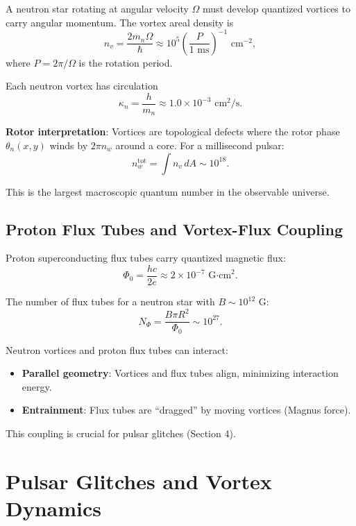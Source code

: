 \documentclass[12pt,a4paper]{article}
\theoremstyle{definition}
\theoremstyle{remark}
\begin{document}
A neutron star rotating at angular velocity $\Omega$ must develop quantized vortices to carry angular momentum. The vortex areal density is
\begin{equation}
n_v = \frac{2m_n \Omega}{\hbar} \approx 10^5 \left(\frac{P}{1 \text{ ms}}\right)^{-1} \text{ cm}^{-2},
\end{equation}
where $P = 2\pi/\Omega$ is the rotation period.

Each neutron vortex has circulation
\begin{equation}
\kappa_n = \frac{h}{m_n} \approx 1.0 \times 10^{-3} \text{ cm}^2/\text{s}.
\end{equation}

\textbf{Rotor interpretation}: Vortices are topological defects where the rotor phase $\theta_n(x,y)$ winds by $2\pi n_w$ around a core. For a millisecond pulsar:
\begin{equation}
n_w^{\text{tot}} = \int n_v \, dA \sim 10^{18}.
\end{equation}

This is the largest macroscopic quantum number in the observable universe.

\subsection{Proton Flux Tubes and Vortex-Flux Coupling}

Proton superconducting flux tubes carry quantized magnetic flux:
\begin{equation}
\Phi_0 = \frac{hc}{2e} \approx 2 \times 10^{-7} \text{ G·cm}^2.
\end{equation}

The number of flux tubes for a neutron star with $B \sim 10^{12}$ G:
\begin{equation}
N_{\Phi} = \frac{B \pi R^2}{\Phi_0} \sim 10^{27}.
\end{equation}

Neutron vortices and proton flux tubes can interact:
\begin{itemize}
\item \textbf{Parallel geometry}: Vortices and flux tubes align, minimizing interaction energy.
\item \textbf{Entrainment}: Flux tubes are ``dragged'' by moving vortices (Magnus force).
\end{itemize}

This coupling is crucial for pulsar glitches (Section 4).

\section{Pulsar Glitches and Vortex Dynamics}
\end{document}
